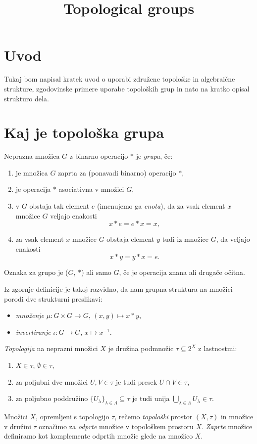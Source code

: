 \documentclass[mat1]{fmfdelo}
\title{Topological groups}
\begin{document}
\section{Uvod}
Tukaj bom napisal kratek uvod o uporabi združene topološke in algebraične strukture, zgodovinske primere uporabe topoloških grup in nato na kratko opisal strukturo dela.

\section{Kaj je topološka grupa}
\begin{definicija}
Neprazna množica $G$ z binarno operacijo $*$ je \emph{grupa}, če:
\begin{enumerate}
\item je množica $G$ zaprta za (ponavadi binarno) operacijo $*$,
\item je operacija $*$ asociativna v množici $G$,
\item v $G$ obstaja tak element $e$ (imenujemo ga \emph{enota}), da za vsak element $x$ množice $G$ veljajo enakosti \[ x*e = e*x = x, \]
\item za vsak element $x$ množice $G$ obstaja element $y$ tudi iz množice $G$, da veljajo enakosti \[ x*y = y*x = e. \]
\end{enumerate}
Oznaka za grupo je ($G$, $*$) ali samo $G$, če je operacija znana ali drugače očitna.
\end{definicija}

Iz zgornje definicije je takoj razvidno, da nam grupna struktura na množici porodi dve strukturni preslikavi:
\begin{itemize}
\item \emph{množenje} $\mu: G \times G \to G$, $(x, y) \mapsto x*y$,
\item \emph{invertiranje} $\iota: G \to G$, $x \mapsto x^{-1}$.
\end{itemize}

\begin{definicija}
\emph{Topologija} na neprazni množici $X$ je družina podmnožic $\tau \subseteq 2^X$ z lastnostmi:
\begin{enumerate}
\item $X \in \tau$, $\emptyset \in \tau$,
\item za poljubni dve množici $U,V \in \tau$ je tudi presek $U \cap V \in \tau$,
\item za poljubno poddružino $\lbrace U_{\lambda} \rbrace_{\lambda \in \Lambda} \subseteq \tau$ je tudi unija $\bigcup\limits_{\lambda \in \Lambda}^{} U_{\lambda} \in \tau$.
\end{enumerate}
Množici $X$, opremljeni s topologijo $\tau$, rečemo \emph{topološki} prostor $(X, \tau)$ in množice v družini $\tau$ označimo za \emph{odprte} množice v topološkem prostoru $X$. \emph{Zaprte} množice definiramo kot komplemente odprtih množic glede na množico $X$.
\end{definicija}
\end{document}
